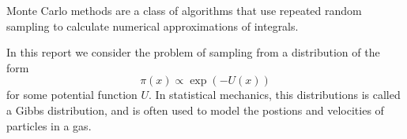 Monte Carlo methods are a class of algorithms that use repeated random sampling to calculate numerical approximations of integrals.

In this report we consider the problem of sampling from a distribution of the form
	$$
	\pi (x) \propto \exp(-U(x))
	$$
for some potential function $U$.  In statistical mechanics, this distributions is called a Gibbs distribution, and is often used to model the postions and velocities of particles in a gas. 

	


